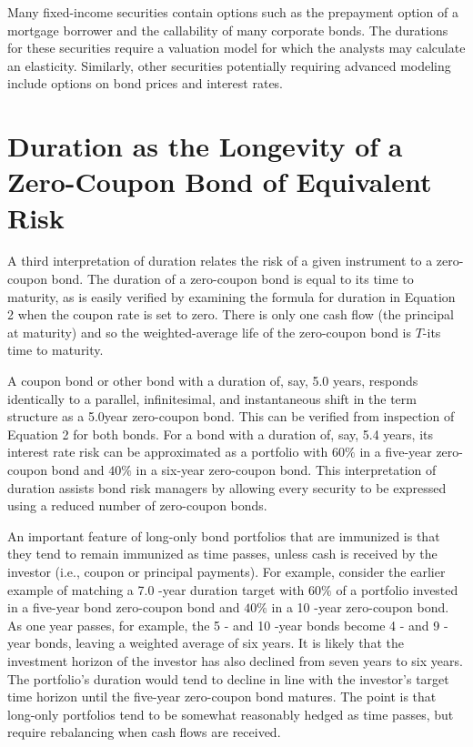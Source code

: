 \documentclass[11pt]{article}
\begin{document}
Many fixed-income securities contain options such as the prepayment option of a mortgage borrower and the callability of many corporate bonds. The durations for these securities require a valuation model for which the analysts may calculate an elasticity. Similarly, other securities potentially requiring advanced modeling include options on bond prices and interest rates.

\section*{Duration as the Longevity of a Zero-Coupon Bond of Equivalent Risk}
A third interpretation of duration relates the risk of a given instrument to a zero-coupon bond. The duration of a zero-coupon bond is equal to its time to maturity, as is easily verified by examining the formula for duration in Equation 2 when the coupon rate is set to zero. There is only one cash flow (the principal at maturity) and so the weighted-average life of the zero-coupon bond is $T$-its time to maturity.

A coupon bond or other bond with a duration of, say, 5.0 years, responds identically to a parallel, infinitesimal, and instantaneous shift in the term structure as a 5.0year zero-coupon bond. This can be verified from inspection of Equation 2 for both bonds. For a bond with a duration of, say, 5.4 years, its interest rate risk can be approximated as a portfolio with $60 \%$ in a five-year zero-coupon bond and $40 \%$ in a six-year zero-coupon bond. This interpretation of duration assists bond risk managers by allowing every security to be expressed using a reduced number of zero-coupon bonds.

An important feature of long-only bond portfolios that are immunized is that they tend to remain immunized as time passes, unless cash is received by the investor (i.e., coupon or principal payments). For example, consider the earlier example of matching a 7.0 -year duration target with $60 \%$ of a portfolio invested in a five-year bond zero-coupon bond and $40 \%$ in a 10 -year zero-coupon bond. As one year passes, for example, the 5 - and 10 -year bonds become 4 - and 9 -year bonds, leaving a weighted average of six years. It is likely that the investment horizon of the investor has also declined from seven years to six years. The portfolio's duration would tend to decline in line with the investor's target time horizon until the five-year zero-coupon bond matures. The point is that long-only portfolios tend to be somewhat reasonably hedged as time passes, but require rebalancing when cash flows are received.
\end{document}
